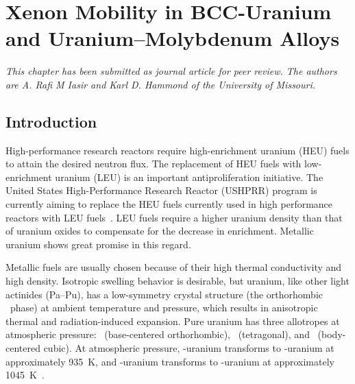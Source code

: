 \chapter{Xenon Mobility in BCC-Uranium and Uranium--Molybdenum Alloys}
\textit{This chapter has been submitted as journal article for peer review. The authors are A. Rafi M Iasir and Karl D. Hammond of the University of Missouri.}

\section{Introduction}\label{sec_intro}
High-performance research reactors require high-enrichment uranium (HEU) fuels
to attain the desired neutron flux. The replacement of HEU fuels with
low-enrichment uranium (LEU) is an important antiproliferation initiative. The
United States High-Performance Research Reactor (USHPRR) program is currently
aiming to replace the HEU fuels currently used in high performance reactors
with LEU fuels~\cite{snelgrove1997development}.
LEU fuels require a higher uranium density than that of uranium oxides
to compensate for the decrease in  enrichment.
Metallic uranium shows great promise in this regard.

Metallic fuels are usually chosen because of their high thermal conductivity
and high density. Isotropic swelling behavior is desirable, but uranium,
like other light actinides (Pa--Pu), has a low-symmetry crystal structure
(the orthorhombic \textalpha\ phase) at ambient temperature and pressure,
which results in anisotropic thermal and radiation-induced expansion.
Pure uranium has three allotropes at atmospheric pressure:
\textalpha\ (base-centered orthorhombic), \textbeta\ (tetragonal), and
\textgamma\ (body-centered cubic). At atmospheric pressure,
\mbox{\textalpha-uranium} transforms to \mbox{\textbeta-uranium} at
approximately 935~K, and \mbox{\textbeta-uranium}
transforms to \mbox{\textgamma-uranium} at approximately
1045~K~\cite{lawson1988structure,akella1997structural}. 

